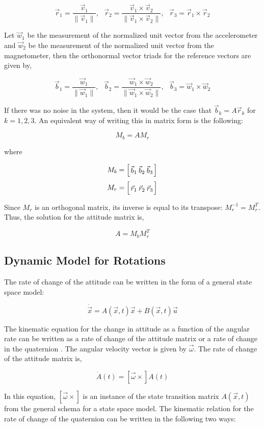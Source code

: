 \documentclass{article}
\newcommand{\mat}[2][ccccccccccccccccccccccccccccccccccccccccccccc]{\left[
        \arraycolsep=1.2pt\def\arraystretch{1.5}
        \begin{array}{#1} #2 \\ 
        \end{array} 
        \right]}
\newcommand{\tab}{ \textrm{ \ \ \ \ } }
\begin{document}
\begin{flushleft}
$$ \vec{r}_1 = \frac{\vec{v}_1}{\| \vec{v}_1 \|}, \tab \vec{r}_2 = \frac{\vec{v}_1 \times \vec{v}_2}{\| \vec{v}_1 \times \vec{v}_2 \|}, \tab \vec{r}_3 = \vec{r}_1 \times \vec{r}_2 $$

Let $\vec{w}_1$ be the measurement of the normalized unit vector from the accelerometer and $\vec{w}_2$ be the measurement of the normalized unit vector from the magnetometer, then the orthonormal vector triads for the reference vectors are given by, 

$$ \vec{b}_1 = \frac{\vec{w}_1}{\| \vec{w}_1 \|}, \tab \vec{b}_2 = \frac{\vec{w}_1 \times \vec{w}_2}{\| \vec{w}_1 \times \vec{w}_2 \|}, \tab \vec{b}_3 = \vec{w}_1 \times \vec{w}_2 $$

If there was no noise in the system, then it would be the case that $\vec{b}_k = A \vec{r}_k$ for $k=1,2,3$. An equivalent way of writing this in matrix form is the following: 

$$ M_b = A M_r $$ 

where 

$$ M_b = \mat{ \vec{b}_1 & \vec{b}_2 & \vec{b}_3 } $$
$$ M_r = \mat{ \vec{r}_1 & \vec{r}_2 & \vec{r}_3 } $$

Since $M_r$ is an orthogonal matrix, its inverse is equal to its transpose: $M_r^{-1} = M_r^{T}$. Thus, the solution for the attitude matrix is, 

$$ A = M_b M_r^{T} $$

\subsection{Dynamic Model for Rotations}

The rate of change of the attitude can be written in the form of a general state space model: 

\[ \dot{\vec{x}} = A(\vec{x}, t) \vec{x} + B(\vec{x}, t) \vec{u} \]

The kinematic equation for the change in attitude as a function of the angular rate can be written as a rate of change of the attitude matrix or a rate of change in the quaternion \cite{Shuster1982}. The angular velocity vector is given by $\vec{\omega}$. The rate of change of the attitude matrix is, 

\[ \dot{A}(t) = [\vec{\omega}\times] A(t) \]

In this equation, $[\vec{\omega}\times]$ is an instance of the state transition matrix $A(\vec{x}, t)$ from the general schema for a state space model. The kinematic relation for the rate of change of the quaternion can be written in the following two ways: 


\end{flushleft}
\end{document}
